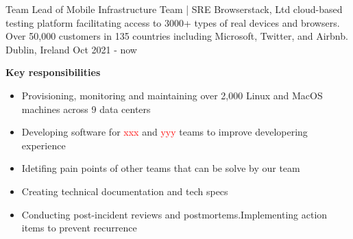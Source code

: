 

\begin{cventries}

    \cventry
    {Team Lead of Mobile Infrastructure Team | SRE} %
    {Browserstack, Ltd \small{cloud-based testing platform facilitating access to 3000+ types of real devices and browsers. Over 50,000 customers in 135 countries including Microsoft, Twitter, and Airbnb.}} %
    {Dublin, Ireland} %
    {Oct 2021 - now} %
    {
        \textbf{Key responsibilities}
        \begin{itemize}
            \item {Provisioning, monitoring and maintaining over 2,000 Linux and MacOS machines across 9 data centers}
            \item {Developing software for \textcolor{red}{xxx} and \textcolor{red}{yyy} teams to improve developering experience}
            \item {Idetifing pain points of other teams that can be solve by our team}
            \item {Creating technical documentation and tech specs}
            \item {Conducting post-incident reviews and postmortems.Implementing action items to prevent recurrence}

\end{itemize}}
\end{cventries}
